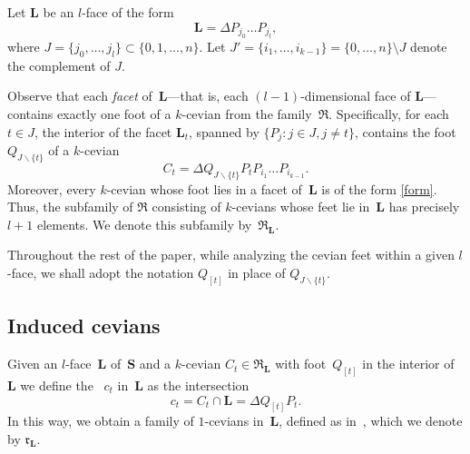 \documentclass[12pt, reqno]{amsart}
\theoremstyle{definition}
\theoremstyle{remark}
\numberwithin{equation}{section}
\begin{document}
{Let $\mathbf{L}$ be an $l$-face of the form  
\[
\mathbf{L}=\Delta P_{j_0}\dotsc P_{j_l},
\]
where $J=\{j_0,\dotsc ,j_l\}\subset\{0,1,...,n\}$. Let $J' = \{ i_1, \dotsc, i_{k-1} \} = \{ 0, \dotsc, n \} \setminus J$ denote the complement of $J$.

Observe that each \emph{facet} of~$\mathbf{L}$---that is, each $(l-1)$-dimensional face of $\mathbf{L}$---contains exactly one foot of a $k$-cevian from the family~$\mathfrak{R}$. Specifically, for each $t\in J$, the interior of the facet ${\mathbf{L}_t}$, spanned by $\{ P_j: j\in J, j\neq t\}$, contains the foot~$Q_{J\backslash\{t\}}$ of a $k$-cevian
\begin{equation} \label{form}
C_t = \Delta Q_{J\backslash\{t\}} P_t P_{i_1} \dotsc P_{i_{k-1}}.
\end{equation}
Moreover, every $k$-cevian whose foot lies in a facet of~$\mathbf{L}$ is of the form \eqref{form}. Thus, the subfamily of $\mathfrak{R}$ consisting of $k$-cevians whose feet lie in~$\mathbf{L}$ has precisely $l+1$ elements. We denote this subfamily by~$\mathfrak{R}_\mathbf{L}$.


Throughout the rest of the paper, while analyzing the cevian feet within a given $l$-face, we shall adopt the notation $Q_{[t]}$ in place of $Q_{J\backslash\{t\}}$.%


\subsection{Induced cevians}
Given an $l$-face~$\mathbf{L}$ of~$\mathbf{S}$ and a $k$-cevian $C_t\in\mathfrak{R}_\mathbf{L}$ with foot~$Q_{[t]}$ in the interior of~$\mathbf{L}$ we define the ~$c_t$ in~$\mathbf{L}$ as the intersection 
\[
c_t = C_t\cap\mathbf{L} = \Delta Q_{[t]}P_t.
\]
In this way, we obtain a family of $1$-cevians in~$\mathbf{L}$, defined as in~\cite{Samet}, which we denote by $\mathfrak{r}_\mathbf{L}$. 

}
\end{document}
